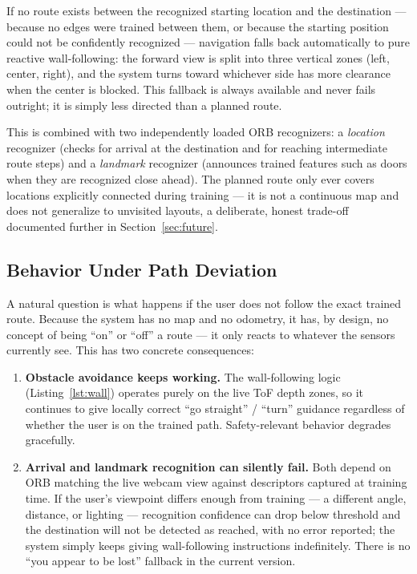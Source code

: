 \documentclass[12pt,a4paper]{article}
\begin{document}
If no route exists between the recognized starting location and the destination — because no edges were trained between them, or because the starting position could not be confidently recognized — navigation falls back automatically to pure reactive wall-following: the forward view is split into three vertical zones (left, center, right), and the system turns toward whichever side has more clearance when the center is blocked. This fallback is always available and never fails outright; it is simply less directed than a planned route.

This is combined with two independently loaded ORB recognizers: a \emph{location} recognizer (checks for arrival at the destination and for reaching intermediate route steps) and a \emph{landmark} recognizer (announces trained features such as doors when they are recognized close ahead). The planned route only ever covers locations explicitly connected during training — it is not a continuous map and does not generalize to unvisited layouts, a deliberate, honest trade-off documented further in Section~\ref{sec:future}.

\subsection{Behavior Under Path Deviation}
\label{sec:deviation}
A natural question is what happens if the user does not follow the exact trained route. Because the system has no map and no odometry, it has, by design, no concept of being ``on'' or ``off'' a route — it only reacts to whatever the sensors currently see. This has two concrete consequences:

\begin{enumerate}[leftmargin=1.4cm]
  \item \textbf{Obstacle avoidance keeps working.} The wall-following logic (Listing~\ref{lst:wall}) operates purely on the live ToF depth zones, so it continues to give locally correct ``go straight'' / ``turn'' guidance regardless of whether the user is on the trained path. Safety-relevant behavior degrades gracefully.
  \item \textbf{Arrival and landmark recognition can silently fail.} Both depend on ORB matching the live webcam view against descriptors captured at training time. If the user's viewpoint differs enough from training — a different angle, distance, or lighting — recognition confidence can drop below threshold and the destination will not be detected as reached, with no error reported; the system simply keeps giving wall-following instructions indefinitely. There is no ``you appear to be lost'' fallback in the current version.
\end{enumerate}
\end{document}
